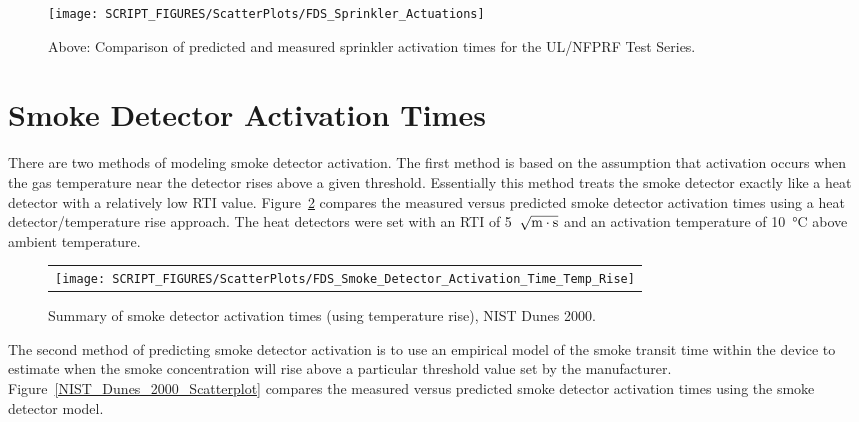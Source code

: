 \begin{figure}[p]
\begin{center}
\texttt{[image: SCRIPT\_FIGURES/ScatterPlots/FDS\_Sprinkler\_Actuations]}
\end{center}
\caption[Summary of sprinkler actuation predictions, UL/NFPRF Tests]
{Above: Comparison of predicted and measured sprinkler activation times for the UL/NFPRF Test Series.}
\label{UL_NFPRF}
\end{figure}




\clearpage

\section{Smoke Detector Activation Times}

There are two methods of modeling smoke detector activation. The first method is based on the assumption that activation occurs when the gas temperature near the detector rises above a given threshold. Essentially this method treats the smoke detector exactly like a heat detector with a relatively low RTI value. Figure~\ref{NIST_Dunes_2000_Scatterplot_Temp_Rise} compares the measured versus predicted smoke detector activation times using a heat detector/temperature rise approach. The heat detectors were set with an RTI of 5~$\sqrt{\hbox{m}\cdot \hbox{s}}$ and an activation temperature of \SI{10}{\celsius} above ambient temperature.

\begin{figure}[h!]
\begin{center}
\begin{tabular}{c}
\texttt{[image: SCRIPT\_FIGURES/ScatterPlots/FDS\_Smoke\_Detector\_Activation\_Time\_Temp\_Rise]}
\end{tabular}
\end{center}
\caption[Summary of smoke detector activation times (temperature rise), NIST Dunes 2000.]
{Summary of smoke detector activation times (using temperature rise), NIST Dunes 2000.}
\label{NIST_Dunes_2000_Scatterplot_Temp_Rise}
\end{figure}

The second method of predicting smoke detector activation is to use an empirical model of the smoke transit time within the device to estimate when the smoke concentration will rise above a particular threshold value set by the manufacturer. Figure~\ref{NIST_Dunes_2000_Scatterplot} compares the measured versus predicted smoke detector activation times using the smoke detector model.


